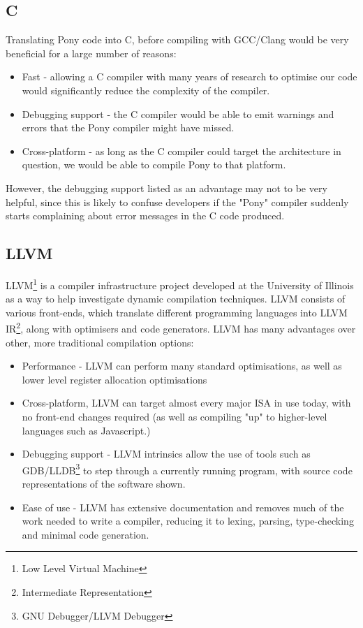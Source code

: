 \documentclass[pdftex,11pt,a4paper]{report}
\begin{document}
\subsection{C}

Translating Pony code into C, before compiling with GCC/Clang would be very beneficial for a large number of reasons:
\begin{itemize}[noitemsep]
\item Fast - allowing a C compiler with many years of research to optimise our code would significantly reduce the complexity of the compiler.
\item Debugging support - the C compiler would be able to emit warnings and errors that the Pony compiler might have missed.
\item Cross-platform - as long as the C compiler could target the architecture in question, we would be able to compile Pony to that platform.
\end{itemize}

However, the debugging support listed as an advantage may not to be very helpful, since this is likely to confuse developers if the "Pony" compiler suddenly starts complaining about error messages in the C code produced.

\subsection{LLVM}

LLVM\footnote{Low Level Virtual Machine} is a compiler infrastructure project developed at the University of Illinois as a way to help investigate dynamic compilation techniques\cite{Lattner:MSThesis02}.
LLVM consists of various front-ends, which translate different programming languages into LLVM IR\footnote{Intermediate Representation}, along with optimisers and code generators.
LLVM has many advantages over other, more traditional compilation options:
\begin{itemize}[noitemsep]
\item Performance - LLVM can perform many standard optimisations, as well as lower level register allocation optimisations
\item Cross-platform, LLVM can target almost every major ISA in use today\cite{llvm-svn}, with no front-end changes required (as well as compiling "up" to higher-level languages such as Javascript.)
\item Debugging support - LLVM intrinsics allow the use of tools such as GDB/LLDB\footnote{GNU Debugger/LLVM Debugger} to step through a currently running program, with source code representations of the software shown.
\item Ease of use - LLVM has extensive documentation and removes much of the work needed to write a compiler, reducing it to lexing, parsing, type-checking and minimal code generation.
\end{itemize}
\end{document}
